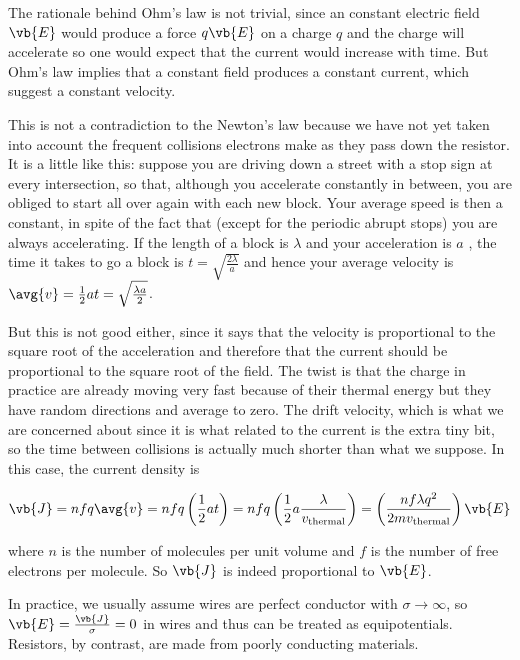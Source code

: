 \documentclass[english,a4paper,12pt]{report}
\begin{document}
The rationale behind Ohm's law is not trivial, since an constant electric field \(\vb{E} \) would produce a force \(q\vb{E} \) on a charge \(q\) and the charge will accelerate so one would expect that the current would increase with time. But Ohm's law implies that a constant field produces a constant current, which suggest a constant velocity.

This is not a contradiction to the Newton's law because we have not yet taken into account the frequent collisions electrons make as they pass down the resistor. It is a little like this: suppose you are driving down a street with a stop sign at every intersection, so that, although you accelerate constantly in between, you are obliged to start all over again with each new block. Your average speed is then a constant, in spite of the fact that (except for the periodic abrupt stops) you are always accelerating. If the length of a block is \(\lambda \)  and your acceleration is \(a\) , the time it takes to go a block is \(t=\sqrt{\frac{2\lambda }{a} }\) and hence your average velocity is \(\avg{v} = \frac{1}{2} at = \sqrt{\frac{\lambda a}{2} }  \). 

But this is not good either, since it says that the velocity is proportional to the square root of the acceleration and therefore that the current should be proportional to the square root of the field. The twist is that the charge in practice are already moving very fast because of their thermal energy but they have random directions and average to zero. The drift velocity, which is what we are concerned about since it is what related to the current is the extra tiny bit, so the time between collisions is actually much shorter than what we suppose. In this case, the current density is

\begin{equation}
    \vb{J} = nfq\avg{v} = nfq \left( \frac{1}{2}at \right) = nfq \left( \frac{1}{2}a\frac{\lambda}{v_{\text{thermal} } }  \right) = \left( \frac{nf\lambda q^2}{2mv_{\text{thermal} } }  \right) \vb{E}  
\end{equation}

where \(n\) is the number of molecules per unit volume and \(f\) is the number of free electrons per molecule. So \(\vb{J} \) is indeed proportional to \(\vb{E} \).  

In practice, we usually assume wires are perfect conductor with \(\sigma \rightarrow \infty\), so \(\vb{E} = \frac{\vb{J} }{\sigma } =0\) in wires and thus can be treated as equipotentials. Resistors, by contrast, are made from poorly conducting materials. 
\end{document}
